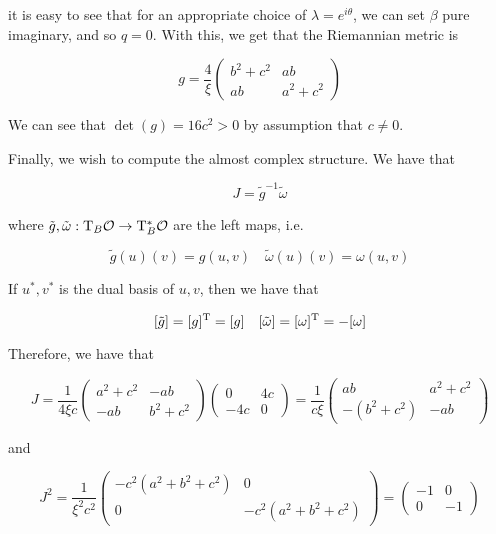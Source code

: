 \documentclass{article}
\begin{document}
it is easy to see that for an appropriate choice of \(\lambda = e^{i\theta}\), we can set \(\beta\) pure imaginary, and so \(q = 0\). With this, we get that the Riemannian metric is

\[g = \frac{4}{\xi}\begin{pmatrix}
    b^2 + c^2 & ab \\
    ab & a^2 + c^2
\end{pmatrix}\]

We can see that \(\det(g) = 16c^2 > 0\) by assumption that \(c\ne0\).

Finally, we wish to compute the almost complex structure. We have that

\[J = \tilde g^{-1}\tilde \omega\]

where \(\tilde g, \tilde \omega : \mathrm{T}_B \mathcal{O} \to \mathrm{T}^*_B\mathcal{O}\) are the left maps, i.e.

\[\tilde g(u)(v) = g(u, v) \quad \tilde\omega(u)(v) = \omega(u, v)\]

If \(u^*, v^*\) is the dual basis of \(u, v\), then we have that

\[[\tilde g] = [g]^{\mathrm{T}} = [g] \quad [\tilde\omega] = [\omega]^{\mathrm{T}} = -[\omega]\]

Therefore, we have that

\[J = \frac{1}{4\xi c}\begin{pmatrix}
    a^2 + c^2 & -ab \\
    -ab & b^2 + c^2
\end{pmatrix}\begin{pmatrix}
    0 & 4c \\ -4c & 0
\end{pmatrix} = \frac{1}{c\xi}\begin{pmatrix}
    ab & a^2 + c^2 \\
    -(b^2 + c^2) & -ab
\end{pmatrix}\]

and

\[J^2 = \frac{1}{\xi^2c^2}\begin{pmatrix}
    -c^2(a^2 + b^2 + c^2) & 0 \\
    0 & -c^2(a^2 + b^2 + c^2)
\end{pmatrix} = \begin{pmatrix}
    -1 & 0 \\ 0 & -1
\end{pmatrix}\]
\end{document}
